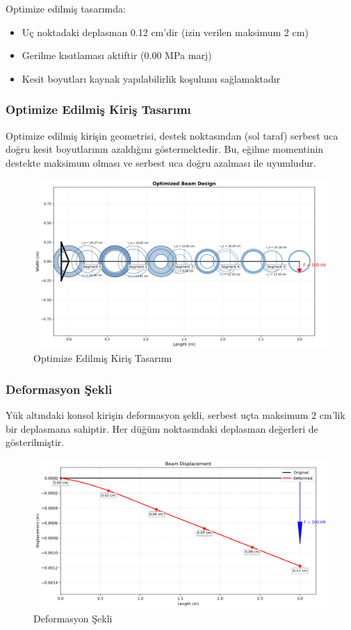 Optimize edilmiş tasarımda:
\begin{itemize}
    \item Uç noktadaki deplasman 0.12 cm'dir (izin verilen maksimum 2 cm)
    \item Gerilme kısıtlaması aktiftir (0.00 MPa marj)
    \item Kesit boyutları kaynak yapılabilirlik koşulunu sağlamaktadır
\end{itemize}

\subsubsection{Optimize Edilmiş Kiriş Tasarımı}
Optimize edilmiş kirişin geometrisi, destek noktasından (sol taraf) serbest uca doğru kesit boyutlarının azaldığını göstermektedir. Bu, eğilme momentinin destekte maksimum olması ve serbest uca doğru azalması ile uyumludur.
\begin{figure}[H]
    \centering
    \includegraphics[width=1\textwidth]{weeks_new/imgs/optimized_beam.png}
    \caption{Optimize Edilmiş Kiriş Tasarımı}
    \label{fig:optimized_beam}
\end{figure}

\subsubsection{Deformasyon Şekli}
Yük altındaki konsol kirişin deformasyon şekli, serbest uçta maksimum 2 cm'lik bir deplasmana sahiptir. Her düğüm noktasındaki deplasman değerleri de gösterilmiştir.

\begin{figure}[H]
    \centering
    \includegraphics[width=1\textwidth]{weeks_new/imgs/deformed_beam.png}
    \caption{Deformasyon Şekli}
    \label{fig:deformed_beam}
\end{figure}

